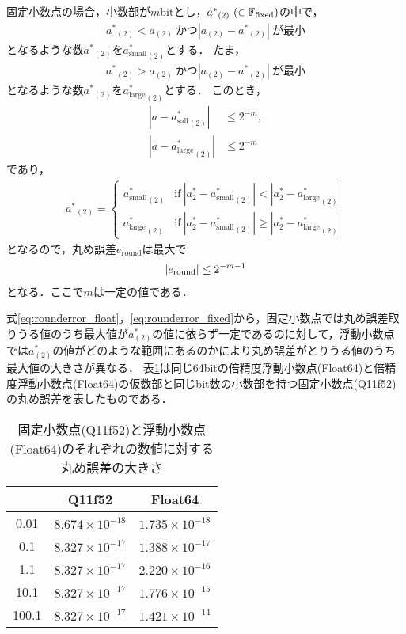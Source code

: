 固定小数点の場合，小数部が$m$bitとし，${a^{\ast}}_{(2)} \ (\in\mathbb{F}_{\text{fixed}})$の中で，
\begin{align*}
    {a^{\ast}}_{(2)} < a_{(2)}\ \text{かつ} |a_{(2)} - {a^{\ast}}_{(2)}| \ \text{が最小}
\end{align*}
となるような数${a^{\ast}}_{(2)}$を${a^{\ast}_{\mathrm{small}}}_{(2)}$とする．
たま，
\begin{align*}
    {a^{\ast}}_{(2)} > a_{(2)} \ \text{かつ} |a_{(2)} - {a^{\ast}}_{(2)}| \ \text{が最小}
\end{align*}
となるような数${a^{\ast}}_{(2)}$を${a^{\ast}_{\mathrm{large}}}_{(2)}$とする．
このとき，
\begin{align}
    |a - {a^{\ast}_{\mathrm{sall}}}_{(2)}| &\leq 2^{-m}, \\
    |a - {a^{\ast}_{\mathrm{large}}}_{(2)}| &\leq 2^{-m}
\end{align}
であり，
\begin{align*}
    {a^{\ast}}_{(2)} = \left\{ 
        \begin{array}{ll}
            {a^{\ast}_{\mathrm{small}}}_{(2)} &\text{if} \ |a^{\ast}_{2} - {a^{\ast}_{\mathrm{small}}}_{(2)} | < |a^{\ast}_{2} - {a^{\ast}_{\mathrm{large}}}_{(2)} | \\
            {a^{\ast}_{\mathrm{large}}}_{(2)} &\text{if} \ |a^{\ast}_{2} - {a^{\ast}_{\mathrm{small}}}_{(2)} | \geq |a^{\ast}_{2} - {a^{\ast}_{\mathrm{large}}}_{(2)} | 
        \end{array}
    \right.
\end{align*}
となるので，丸め誤差$e_{\mathrm{round}}$は最大で
\begin{align}
    \label{eq:rounderror_fixed}
    |e_{\mathrm{round}}| \leq 2^{-m-1}
\end{align}
となる．ここで$m$は一定の値である．


式\eqref{eq:rounderror_float}，\eqref{eq:rounderror_fixed}から，固定小数点では丸め誤差取りうる値のうち最大値が$a^{\ast}_{(2)}$の値に依らず一定であるのに対して，浮動小数点では$a^{\ast}_{(2)}$の値がどのような範囲にあるのかにより丸め誤差がとりうる値のうち最大値の大きさが異なる．
表\ref{tab:fixed_float_rounding_error}は同じ64bitの倍精度浮動小数点(Float64)と倍精度浮動小数点(Float64)の仮数部と同じbit数の小数部を持つ固定小数点(Q11f52)の丸め誤差を表したものである．

\begin{table}[H]
    \centering
    \caption{固定小数点(Q11f52)と浮動小数点(Float64)のそれぞれの数値に対する丸め誤差の大きさ}
    \begin{tabular}{c|c|c}
        & Q11f52 & Float64 \\ \hline \hline
        0.01 & $8.674 \times 10^{-18}$ & $1.735 \times 10^{-18}$\\
        0.1 & $8.327 \times 10^{-17}$ & $1.388 \times 10^{-17}$\\
        1.1 & $8.327 \times 10^{-17}$ & $2.220 \times 10^{-16}$\\
        10.1 & $8.327 \times 10^{-17}$ & $1.776 \times 10^{-15}$\\
        100.1 & $8.327 \times 10^{-17}$ & $1.421 \times 10^{-14}$ 
    \end{tabular}
    \label{tab:fixed_float_rounding_error}
\end{table}


